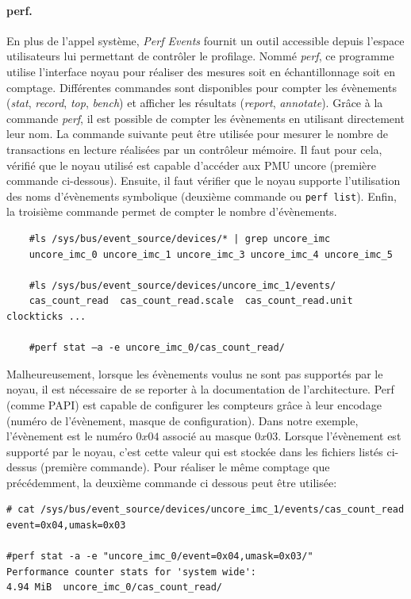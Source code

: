         
            \paragraph{perf.} 
            En plus de l'appel système, \textit{Perf Events} fournit un outil accessible depuis l'espace utilisateurs lui permettant de contrôler le profilage. Nommé \textit{perf}, ce programme utilise l'interface noyau pour réaliser des mesures soit en échantillonnage soit en comptage. Différentes commandes sont disponibles pour compter les évènements (\textit{stat}, \textit{record}, \textit{top}, \textit{bench}) et afficher les résultats (\textit{report}, \textit{annotate}). Grâce à la commande \textit{perf}, il est possible de compter les évènements en utilisant directement leur nom. La commande suivante peut être utilisée pour mesurer le nombre de transactions en lecture réalisées par un contrôleur mémoire. Il faut pour cela, vérifié que le noyau utilisé est capable d'accéder aux PMU uncore (première commande ci-dessous). Ensuite, il faut vérifier que le noyau supporte l'utilisation des noms d'évènements symbolique (deuxième commande ou \verb|perf list|). Enfin, la troisième commande permet de compter le nombre d'évènements.
            
    \begin{verbatim}
    #ls /sys/bus/event_source/devices/* | grep uncore_imc
    uncore_imc_0 uncore_imc_1 uncore_imc_3 uncore_imc_4 uncore_imc_5
    
    #ls /sys/bus/event_source/devices/uncore_imc_1/events/
    cas_count_read  cas_count_read.scale  cas_count_read.unit clockticks ...         
    
    #perf stat –a -e uncore_imc_0/cas_count_read/
    \end{verbatim}
            
            Malheureusement, lorsque les évènements voulus ne sont pas supportés par le noyau, il est nécessaire de se reporter à la documentation de l'architecture. Perf (comme PAPI) est capable de configurer les compteurs grâce à leur encodage (numéro de l'évènement, masque de configuration). Dans notre exemple, l'évènement est le numéro $0x04$ associé au masque $0x03$. Lorsque l'évènement est supporté par le noyau, c'est cette valeur qui est stockée dans les fichiers listés ci-dessus (première commande). Pour réaliser le même comptage que précédemment, la deuxième commande ci dessous peut être utilisée:

\begin{verbatim}
# cat /sys/bus/event_source/devices/uncore_imc_1/events/cas_count_read
event=0x04,umask=0x03

#perf stat -a -e "uncore_imc_0/event=0x04,umask=0x03/"
Performance counter stats for 'system wide':
4.94 MiB  uncore_imc_0/cas_count_read/
\end{verbatim}

